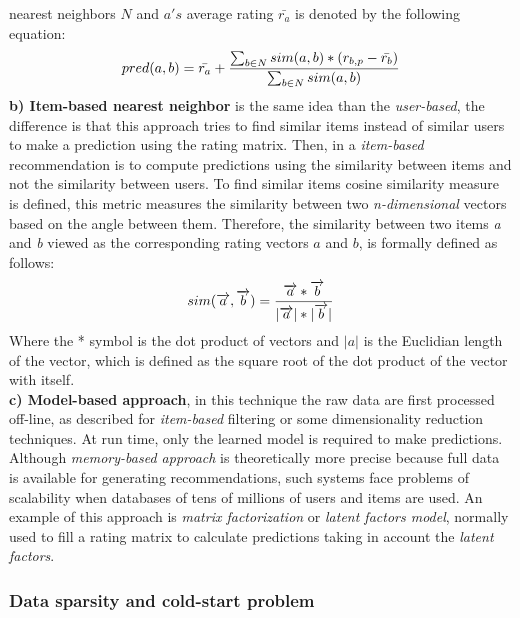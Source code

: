 nearest neighbors $N$ and $a's$ average rating $\bar{r_a}$ is denoted
by the following equation:
\begin{equation}\label{eq:prediction}
\displaystyle pred(a,b) = \bar{r_a} + 
{\sum_{b \in N} sim(a,b) * (r_{b,p}- \bar{r_b}) 
\over \sum_{b \in N} sim(a,b)} 
\end{equation}
\textbf{b) Item-based nearest neighbor} is the same idea than the \textit
{user-based}, the difference is that this approach tries to find
similar items instead of similar users to make a prediction using the rating
matrix. Then, in a \textit{item-based} recommendation is to compute
predictions using the similarity between items and not the similarity
between users. To find similar items cosine similarity measure is
defined, this metric measures the similarity between two
\textit{n-dimensional} vectors based on the angle between them.
Therefore, the similarity between two items \textit{a} and \textit{b}
viewed as the corresponding rating vectors $a$ and $b$, is formally
defined as follows:
\begin{equation}\label{eq:cosine}
\displaystyle sim(\overrightarrow{a},\overrightarrow{b})= 
{\overrightarrow{a}* \overrightarrow{b} \over
|\overrightarrow{a}|*|\overrightarrow{b}| }
\end{equation}
Where the * symbol is the dot product of vectors and $|a|$ is the Euclidian
length of the vector, which is defined as the square root of the dot
product of the vector with itself.\\  
\textbf{c) Model-based approach}, in this technique  the raw data are
first processed off-line, as described for \textit {item-based}
filtering or some dimensionality reduction techniques. At run time,
only the learned model is required to make predictions. Although
\textit{memory-based approach} is theoretically more precise because
full data is available for generating recommendations, such systems
face problems of scalability when databases of tens of millions of
users and items are used. An example of this approach is \textit{matrix
factorization} or \textit{latent factors model}, normally used to fill a rating
matrix to calculate predictions taking in account the \textit{latent factors}.

\subsubsection{Data sparsity and cold-start problem}

